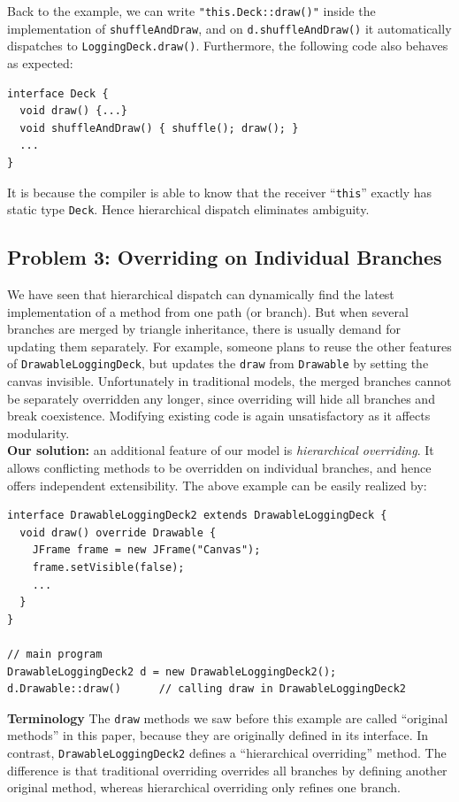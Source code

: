 Back to the example, we can write \lstinline|"this.Deck::draw()"| inside the implementation of \lstinline|shuffleAndDraw|, and on \lstinline|d.shuffleAndDraw()| it automatically dispatches to \lstinline|LoggingDeck.draw()|. Furthermore, the following code
also behaves as expected:
\vspace{3pt}\begin{lstlisting}
interface Deck {
  void draw() {...}
  void shuffleAndDraw() { shuffle(); draw(); }
  ...
}
\end{lstlisting}\vspace{3pt}
It is because the compiler is able to know that the receiver ``\lstinline|this|'' exactly has static type \lstinline|Deck|. Hence hierarchical dispatch eliminates ambiguity.

\subsection{Problem 3: Overriding on Individual Branches}\label{subsec:partialoverrides}

We have seen that hierarchical dispatch can dynamically find the latest implementation of a method from one path (or branch). But when
several branches are merged by triangle inheritance, there is usually demand for updating them separately. For example, someone plans to
reuse the other features of \lstinline|DrawableLoggingDeck|, but updates the \lstinline|draw| from \lstinline|Drawable| by setting the canvas
invisible. Unfortunately in traditional models, the merged branches cannot be separately overridden any longer, since overriding
will hide all branches and break coexistence. Modifying existing code is again unsatisfactory as it affects modularity.\\

\noindent\textbf{Our solution:} an additional feature of our model is \textit{hierarchical overriding}. It allows conflicting methods
to be overridden on individual branches, and hence offers independent extensibility. The above example can be easily realized by:
\vspace{3pt}\begin{lstlisting}
interface DrawableLoggingDeck2 extends DrawableLoggingDeck {
  void draw() override Drawable {
    JFrame frame = new JFrame("Canvas");
    frame.setVisible(false);
    ...
  }
}

// main program
DrawableLoggingDeck2 d = new DrawableLoggingDeck2();
d.Drawable::draw()      // calling draw in DrawableLoggingDeck2
\end{lstlisting}\vspace{3pt}
\textbf{Terminology} The \lstinline|draw| methods we saw before this example are called ``original methods'' in this paper, because they are originally defined in its interface.
In contrast, \lstinline|DrawableLoggingDeck2| defines a ``hierarchical overriding'' method. The difference is that traditional overriding overrides all branches by defining another original method, whereas hierarchical overriding only refines one branch.

